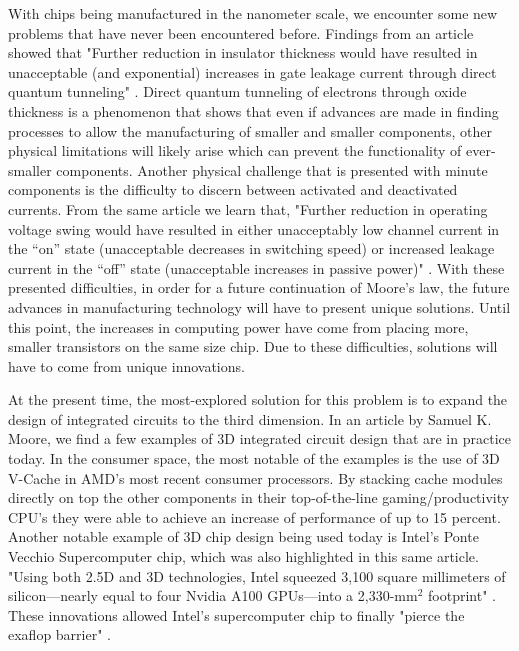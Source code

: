 \documentclass[12pt]{article}
\begin{document}
\begin{flushleft}
With chips being manufactured in the nanometer scale,
we encounter some new problems that have never been
encountered before. Findings from an article showed
that "Further reduction in insulator thickness would
have resulted in unacceptable (and exponential) increases
in gate leakage current through direct quantum tunneling"
\parencite{7878935}. Direct quantum tunneling of electrons
through oxide thickness is a phenomenon that shows
that even if advances are made in finding processes
to allow the manufacturing of smaller and smaller components,
other physical limitations will likely arise which
can prevent the functionality of ever-smaller components.
Another physical challenge that is presented with
minute components is the difficulty to discern between
activated and deactivated currents. From the same
article we learn that, "Further reduction in operating
voltage swing would have resulted in either unacceptably
low channel current in the “on” state (unacceptable
decreases in switching speed) or increased leakage
current in the “off” state (unacceptable increases
in passive power)" \parencite{7878935}. With these
presented difficulties, in order for a future continuation
of Moore's law, the future advances in manufacturing
technology will have to present unique solutions.
Until this point, the increases in computing power
have come from placing more, smaller transistors on
the same size chip. Due to these difficulties, solutions
will have to come from unique innovations.

At the present time, the most-explored solution for
this problem is to expand the design of integrated
circuits to the third dimension. In an article by Samuel
K. Moore, we find a few examples of 3D integrated circuit
design that are in practice today. In the consumer
space, the most notable of the examples is the use
of 3D V-Cache in AMD's most recent consumer processors.
By stacking cache modules directly on top the other
components in their top-of-the-line gaming/productivity
CPU's they were able to achieve an increase of performance
of up to 15 percent. Another notable example of 3D
chip design being used today is Intel's Ponte Vecchio
Supercomputer chip, which was also highlighted in
this same article. "Using both 2.5D and 3D technologies,
Intel squeezed 3,100 square millimeters of silicon—nearly
equal to four Nvidia A100 GPUs—into a 2,330-mm$^2$ footprint"
\parencite{9792148}. These innovations allowed Intel's
supercomputer chip to finally "pierce the exaflop barrier"
\parencite{9792148}.


\end{flushleft}
\end{document}

